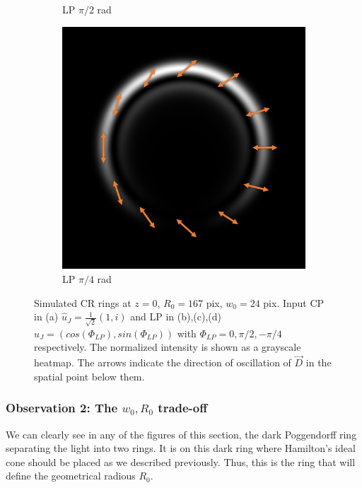 \documentclass[11pt, a4paper, twoside]{article} %
\begin{document}
\begin{figure}[h!]
\begin{subfigure}[b]{0.245\linewidth}
     \caption{LP $\pi/2$ rad}
     \end{subfigure}
  \begin{subfigure}[b]{0.245\linewidth}
     \includegraphics[width=\linewidth]{simul24.PNG}
     \caption{LP $\pi/4$ rad}
     \end{subfigure}
    \caption{Simulated CR rings at $z=0$, $R_0=167$ pix, $w_0=24$ pix. Input CP in (a) $\hat{u}_J=\frac{1}{\sqrt{2}}(1,i)$ and LP in (b),(c),(d) $\hat{u}_J=(cos(\Phi_{LP}),sin(\Phi_{LP}))$ with $\Phi_{LP}=0,\pi/2,-\pi/4$ respectively. The normalized intensity is shown as a grayscale heatmap. The arrows indicate the direction of oscillation of $\vec{D}$ in the spatial point below them.}
            \label{fig:simul2}
\vspace{-0.1cm}
\end{figure}

\subsubsection*{Observation 2: The $w_0,R_0$ trade-off}\vspace{-0.1cm}
We can clearly see in any of the figures of this section, the dark Poggendorff ring separating the light into two rings. It is on this dark ring where Hamilton's ideal cone should be placed as we described previously. Thus, this is the ring that will define the geometrical radious $R_0$. 
\end{document}
